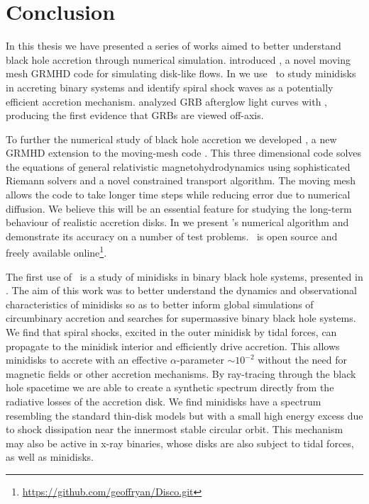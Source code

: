 \chapter*{Conclusion}

In this thesis we have presented a series of works aimed to better understand black hole accretion through numerical simulation.   introduced \grdisco, a novel moving mesh GRMHD code for simulating disk-like flows.  In  we use \discogr\ to study minidisks in accreting binary systems and identify spiral shock waves as a potentially efficient accretion mechanism.   analyzed GRB afterglow light curves with \scalefit, producing the first evidence that GRBs are viewed off-axis.

To further the numerical study of black hole accretion we developed \grdisco, a new GRMHD extension to the moving-mesh code \disco \citep{Duffell16}.  This three dimensional code solves the equations of general relativistic magnetohydrodynamics using sophisticated Riemann solvers and a novel constrained transport algorithm.  The moving mesh allows the code to take longer time steps while reducing error due to numerical diffusion.  We believe this will be an essential feature for studying the long-term behaviour of realistic accretion disks.  In  we present \discogr 's numerical algorithm and demonstrate its accuracy on a number of test problems.  \discogr\ is open source and freely available online\footnote{\url{https://github.com/geoffryan/Disco.git}}.

The first use of \discogr\ is a study of minidisks in binary black hole systems, presented in .  The aim of this work was to better understand the dynamics and observational characteristics of minidisks so as to better inform global simulations of circumbinary accretion and searches for supermassive binary black hole systems.  We find that spiral shocks, excited in the outer minidisk by tidal forces, can propagate to the minidisk interior and efficiently drive accretion.  This allows minidisks to accrete with an effective $\alpha$-parameter $\sim 10^{-2}$ without the need for magnetic fields or other accretion mechanisms.  By ray-tracing through the black hole spacetime we are able to create a synthetic spectrum directly from the radiative losses of the accretion disk.  We find minidisks have a spectrum resembling the standard thin-disk models but with a small high energy excess due to shock dissipation near the innermost stable circular orbit.  This mechanism may also be active in x-ray binaries, whose disks are also subject to tidal forces, as well as minidisks.

